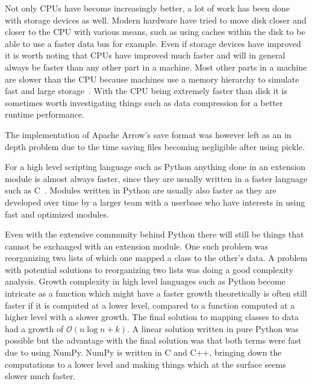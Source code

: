 \documentclass[12pt, a4paper]{article}
\begin{document}
Not only CPUs have become increasingly better, a lot of work has been done with storage devices as well.
Modern hardware have tried to move disk closer and closer to the CPU with various means, such as using caches within the disk to be able to use a faster data bus for example.
Even if storage devices have improved it is worth noting that CPUs have improved much faster and will in general always be faster than any other part in a machine.
Most other parts in a machine are slower than the CPU because machines use a memory hierarchy to simulate fast and large storage~\cite{ComputerMemoryHierarchy, enwiki:memoryHierarchy}.
With the CPU being extremely faster than disk it is sometimes worth investigating things such as data compression for a better runtime performance.

The implementation of Apache Arrow's save format was however left as an in depth problem due to the time saving files becoming negligible after using pickle.

For a high level scripting language such as Python anything done in an extension module is almost always faster, since they are usually written in a faster language such as C~\cite{cFaster}.
Modules written in Python are usually also faster as they are developed over time by a larger team with a userbase who have interests in using fast and optimized modules.

Even with the extensive community behind Python there will still be things that cannot be exchanged with an extension module.
One such problem was reorganizing two lists of which one mapped a class to the other's data.
A problem with potential solutions to reorganizing two lists was doing a good complexity analysis.
Growth complexity in high level languages such as Python become intricate as a function which might have a faster growth theoretically is often still faster if it is computed at a lower level, compared to a function computed at a higher level with a slower growth.
The final solution to mapping classes to data had a growth of $\mathcal{O}(n\log n + k)$.
A linear solution written in pure Python was possible but the advantage with the final solution was that both terms were fast due to using NumPy.
NumPy is written in C and C++, bringing down the computations to a lower level and making things which at the surface seems slower much faster.
\newpage

\end{document}
